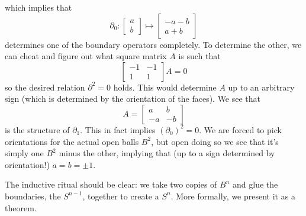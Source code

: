 which implies that
\begin{equation}%
\partial_{0}:\begin{bmatrix}a\\b\end{bmatrix}\mapsto\begin{bmatrix}-a-b\\a+b\end{bmatrix}
\end{equation}
determines one of the boundary operators completely. To determine
the other, we can cheat and figure out what square matrix $A$ is such
that
\begin{equation}%
\begin{bmatrix} -1 & -1\\1 & 1\end{bmatrix}A = 0
\end{equation}
so the desired relation $\partial^{2}=0$ holds. This would
determine $A$ up to an arbitrary sign (which is determined by the
orientation of the faces). We see that
\begin{equation}%
A = \begin{bmatrix}a & b\\
-a & -b\end{bmatrix}
\end{equation}
is the structure of $\partial_{1}$. This in fact implies
$(\partial_{0})^{2}=0$. We are forced to pick orientations for
the actual open balls $B^{2}$, but open doing so we see that it's
simply one $B^{2}$ minus the other, implying that (up to a sign
determined by orientation!) $a=b=\pm1$.

The inductive ritual should be clear: we take two copies of
$B^{n}$ and glue the boundaries, the $S^{n-1}$, together to
create a $S^{n}$. More formally, we present it as a theorem.

